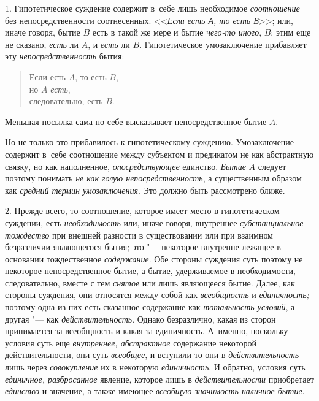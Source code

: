 1. Гипотетическое суждение содержит в~себе лишь необходимое
{\em соотношение} без непосредственности соотнесенных.
<<{\em Если есть А, то есть В}>>; или, иначе говоря, бытие $B$ есть в такой же
мере и бытие {\em чего-то иного}, $B$; этим еще не сказано, {\em есть} ли
$A$, и {\em есть} ли $B$. Гипотетическое умозаключение прибавляет эту
{\em непосредственность} бытия:

\begin{verse}
Если есть $A$, то есть $B$,\\
но $A$ {\em есть},\\
следовательно, есть $B$.
\end{verse}

Меньшая посылка сама по себе высказывает непосредственное бытие $A$.

Но не только это прибавилось к гипотетическому суждению.
Умозаключение содержит в~себе соотношение между субъектом и предикатом не
как абстрактную связку, но как наполненное, {\em опосредствующее}
единство. {\em Бытие} $A$ следует поэтому понимать
{\em не как голую непосредственность}, а существенным образом как
{\em средний термин умозаключения}. Это должно быть рассмотрено ближе.

2. Прежде всего, то соотношение, которое имеет место в
гипотетическом суждении, есть {\em необходимость} или,
иначе говоря, внутреннее {\em субстанциальное тождество}
при внешней разности в существовании или при
взаимном безразличии являющегося бытия; это "--- некоторое
внутренне лежащее в основании тождественное {\em содержание}. Обе
стороны суждения суть поэтому не некоторое непосредственное бытие, а бытие,
удерживаемое в необходимости, следовательно, вместе с тем {\em снятое} или лишь
являющееся бытие. Далее, как стороны суждения, они относятся между собой
как {\em всеобщность} и {\em единичность;}
поэтому одна из них есть сказанное содержание как
{\em тотальность условий}, а другая "--- как {\em действительность}.
Однако безразлично, какая из сторон принимается за
всеобщность и какая за единичность. А~именно, поскольку условия суть еще
{\em внутреннее, абстрактное}
содержание некоторой действительности, они суть
{\em всеобщее}, и вступили-то они в {\em действительность}
лишь через {\em совокупление} их в некоторую {\em единичность}.
И обратно, условия суть {\em единичное, разбросанное}
явление, которое лишь в {\em действительности} приобретает {\em единство} и
значение, а также имеющее {\em всеобщую значимость наличное бытие}.

